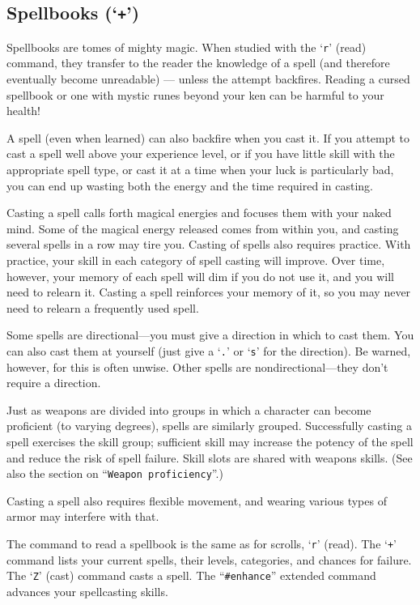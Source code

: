 \subsection*{Spellbooks (`{\tt +}')}


Spellbooks are tomes of mighty magic.  When studied with the `{\tt r}' (read)
command, they transfer to the reader the knowledge of a spell (and
therefore eventually become unreadable) --- unless the attempt backfires.
Reading a cursed spellbook or one with mystic runes beyond
your ken can be harmful to your health!

A spell (even when learned) can also backfire when you cast it.  If you
attempt to cast a spell well above your experience level, or if you have
little skill with the appropriate spell type, or cast it at
a time when your luck is particularly bad, you can end up wasting both the
energy and the time required in casting.

Casting a spell calls forth magical energies and focuses them with
your naked mind.  Some of the magical energy released comes from within
you, and casting several spells in a row may tire you.
Casting of spells also requires practice.  With practice, your
skill in each category of spell casting will improve.  Over time, however,
your memory of each spell will dim if you do not use it, and you will need 
to relearn it. Casting a spell reinforces your memory of it, so you may
never need to relearn a frequently used spell.

Some spells are
directional---you must give a direction in which to cast them.  You can also
cast them at yourself (just give a `{\tt .}' or `{\tt s}' for the direction). Be warned,
however, for this is often unwise.  Other spells are nondirectional---they
don't require a direction.

Just as weapons are divided into groups in which a character can become
proficient (to varying degrees), spells are similarly grouped.
Successfully casting a spell exercises the skill group; sufficient skill
may increase the potency of the spell and reduce the risk of spell failure.
Skill slots are shared with weapons skills.  (See also the section on
``{\tt Weapon proficiency}''.)

Casting a spell also requires flexible movement, and wearing various types
of armor may interfere with that.

The command to read a spellbook is the same as for scrolls, `{\tt r}'
(read).  The `{\tt +}' command lists your current spells, their levels,
categories, and chances for failure.  
The `{\tt Z}' (cast) command casts a spell.
The ``{\tt \#enhance}'' extended command advances your spellcasting skills.
